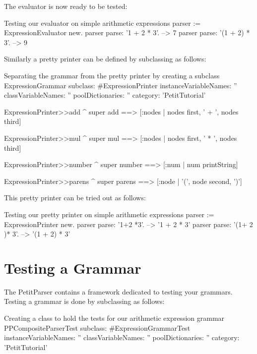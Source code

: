 \documentclass[a4paper,10pt,twoside]{book}
\begin{document}
The evaluator is now ready to be tested:

\begin{script}{Testing our evaluator on simple arithmetic expressions}
parser := ExpressionEvaluator new.
parser parse: '1 + 2 * 3'.       --> 7
parser parse: '(1 + 2) * 3'.     --> 9
\end{script}

Similarly a pretty printer can be defined by subclassing
 as follows:

\begin{script}{Separating the grammar from the pretty printer by creating a subclass}
ExpressionGrammar subclass: #ExpressionPrinter
  instanceVariableNames: ''
  classVariableNames: ''
  poolDictionaries: ''
  category: 'PetitTutorial'

ExpressionPrinter>>add
  ^ super add ==> [:nodes | nodes first, ' + ', nodes third]

ExpressionPrinter>>mul
  ^ super mul ==> [:nodes | nodes first, ' * ', nodes third]

ExpressionPrinter>>number
  ^ super number ==> [:num | num printString]

ExpressionPrinter>>parens
  ^ super parens ==> [:node | '(', node second, ')']
\end{script}

This pretty printer can be tried out as follows:

\begin{script}{Testing our pretty printer on simple arithmetic expressions}
parser := ExpressionPrinter new.
parser parse: '1+2 *3'.          --> '1 + 2 * 3'
parser parse: '(1+ 2 )* 3'.      --> '(1 + 2) * 3'
\end{script}

\section{Testing a Grammar}

The PetitParser contains a framework dedicated to testing your
grammars. Testing a grammar is done by subclassing
 as follows:

\begin{script}{Creating a class to hold the tests for our arithmetic expression grammar}
PPCompositeParserTest subclass: #ExpressionGrammarTest
  instanceVariableNames: ''
  classVariableNames: ''
  poolDictionaries: ''
  category: 'PetitTutorial'
\end{script}
\end{document}
